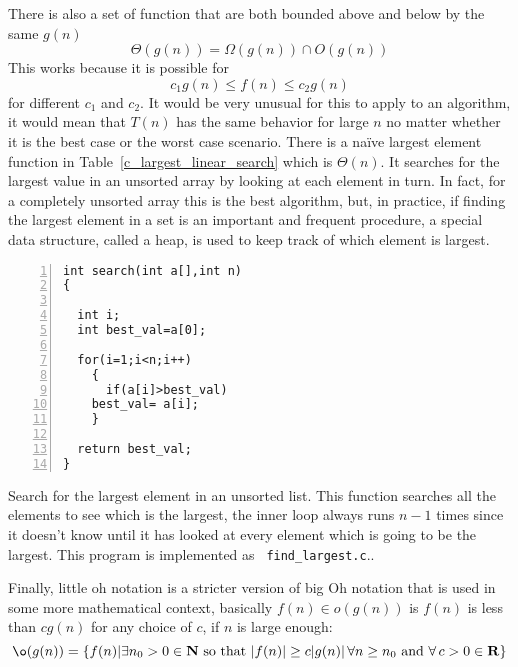 \documentclass[11pt,a4paper]{scrartcl}
\begin{document}
There is also a set of function that are both bounded above and below
by the same $g(n)$
\begin{equation}
\Theta(g(n))=\Omega(g(n))\cap O(g(n))
\end{equation}
This works because it is possible for
\begin{equation}
c_1 g(n)\le f(n)\le c_2g(n)
\end{equation}
for different $c_1$ and $c_2$. It would be very unusual for this to
apply to an algorithm, it would mean that $T(n)$ has the same behavior
for large $n$ no matter whether it is the best case or the worst case
scenario. There is a na\"ive largest element function in
Table~\ref{c_largest_linear_search} which is $\Theta(n)$. It searches
for the largest value in an unsorted array by looking at each element
in turn. In fact, for a completely unsorted array this is the best
algorithm, but, in practice, if finding the largest element in a set
is an important and frequent procedure, a special data structure,
called a heap, is used to keep track of which element is largest.

\begin{table}
\begin{lstlisting}[numbers=left]
int search(int a[],int n)
{

  int i;
  int best_val=a[0];

  for(i=1;i<n;i++)
    {
      if(a[i]>best_val)
	best_val= a[i];
    }

  return best_val;
}
\end{lstlisting}
\caption{Search for the largest element in an unsorted list. This
  function searches all the elements to see which is the largest, the
  inner loop always runs $n-1$ times since it doesn't know until it
  has looked at every element which is going to be the largest. This
  program is implemented as {\tt
    find\_largest.c}.\label{c_largest_linear_search}.}
\end{table}

Finally, little oh notation is a stricter version of big Oh notation
that is used in some more mathematical context, basically $f(n)\in
o(g(n))$ is $f(n)$ is less than $cg(n)$ for any choice of $c$, if $n$
is large enough:
\begin{equation}
\o(g(n))=\{f(n)| \exists n_0>0\in {\bf N}\mbox{ so that }|f(n)|\ge
c|g(n)|\,\forall n\ge n_0 \mbox{ and }\forall\,c>0\in {\bf R}\}
\end{equation}
\end{document}
